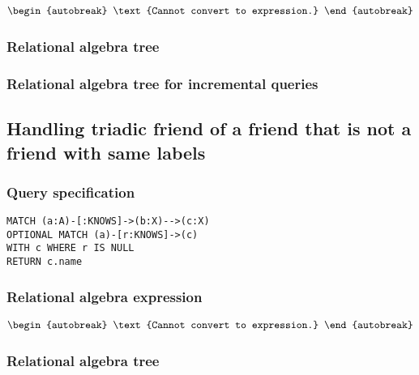 \begin{align*}
\begin{autobreak}
\text{Cannot convert to expression.}
\end{autobreak}
\end{align*}

\subsubsection*{Relational algebra tree}


\subsubsection*{Relational algebra tree for incremental queries}


\subsection{Handling triadic friend of a friend that is not a friend with same labels}

\subsubsection*{Query specification}

\begin{lstlisting}
MATCH (a:A)-[:KNOWS]->(b:X)-->(c:X)
OPTIONAL MATCH (a)-[r:KNOWS]->(c)
WITH c WHERE r IS NULL
RETURN c.name
\end{lstlisting}

\subsubsection*{Relational algebra expression}

\begin{align*}
\begin{autobreak}
\text{Cannot convert to expression.}
\end{autobreak}
\end{align*}

\subsubsection*{Relational algebra tree}

